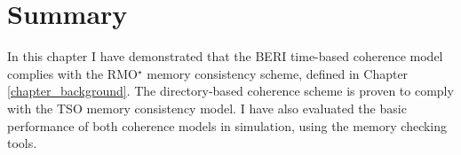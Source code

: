 \section{Summary}
	In this chapter I have demonstrated that the BERI time-based coherence model complies with the RMO{\large$^\star$} memory consistency scheme, defined in Chapter \ref{chapter_background}. The directory-based coherence scheme is proven to comply with the TSO memory consistency model. I have also evaluated the basic performance of both coherence models in simulation, using the memory checking tools.




















































































































